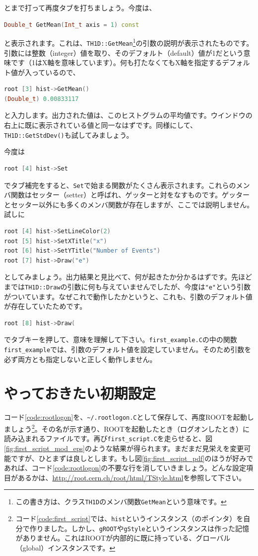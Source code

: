 とまで打って再度タブを打ちましょう。今度は、
\begin{lstlisting}[language=c++]
Double_t GetMean(Int_t axis = 1) const
\end{lstlisting}
と表示されます。これは、\texttt{TH1D::GetMean}\footnote{この書き方は、クラス\texttt{TH1D}のメンバ関数\texttt{GetMean}という意味です。}の引数の説明が表示されたものです。引数には整数（integer）値を取り、そのデフォルト（default）値が1だという意味です（1はX軸を意味しています）。何も打たなくてもX軸を指定するデフォルト値が入っているので、
\begin{lstlisting}[language=c++]
root [3] hist->GetMean()
(Double_t) 0.00833117
\end{lstlisting}
と入力します。出力された値は、このヒストグラムの平均値です。ウインドウの右上に既に表示されている値と同一なはずです。同様にして、\texttt{TH1D::GetStdDev()}も試してみましょう。

今度は
\begin{lstlisting}[language=c++]
root [4] hist->Set
\end{lstlisting}
でタブ補完をすると、\texttt{Set}で始まる関数がたくさん表示されます。これらのメンバ関数はセッター（setter）と呼ばれ、ゲッターと対をなすものです。ゲッターとセッター以外にも多くのメンバ関数が存在しますが、ここでは説明しません。試しに
\begin{lstlisting}[language=c++]
root [4] hist->SetLineColor(2)
root [5] hist->SetXTitle("x")
root [6] hist->SetYTitle("Number of Events")
root [7] hist->Draw("e")
\end{lstlisting}
としてみましょう。出力結果と見比べて、何が起きたか分かるはずです。先ほどまでは\texttt{TH1D::Draw}の引数に何も与えていませんでしたが、今度は\texttt{"e"}という引数がついています。なぜこれで動作したかというと、これも、引数のデフォルト値が存在していたためです。
\begin{lstlisting}[language=c++]
root [8] hist->Draw(
\end{lstlisting}
でタブキーを押して、意味を理解して下さい。\texttt{first\_example.C}の中の関数\texttt{first\_example}では、引数のデフォルト値を設定していません。そのため引数を必ず両方とも指定しないと正しく動作しません。

\section{やっておきたい初期設定}

コード\ref{code:rootlogon}を、\texttt{\~{}/.rootlogon.C}として保存して、再度ROOTを起動しましょう\footnote{コード\ref{code:first_script}では、\texttt{hist}というインスタンス（のポインタ）を自分で作りました。しかし、\texttt{gROOT}や\texttt{gStyle}というインスタンスは作った記憶がありません。これはROOTが内部的に既に持っている、グローバル（global）インスタンスです。}。その名が示す通り、ROOTを起動したとき（ログオンしたとき）に読み込まれるファイルです。再び\texttt{first\_script.C}を走らせると、図\ref{fig:first_script_mod_eps}のような結果が得られます。まだまだ見栄えを変更可能ですが、ひとまずは良しとします。もし図\ref{fig:first_script_pdf}のほうが好みであれば、コード\ref{code:rootlogon}の不要な行を消していきましょう。どんな設定項目があるかは、\url{http://root.cern.ch/root/html/TStyle.html}を参照して下さい。


